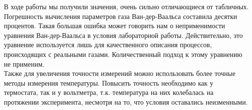 \documentclass[a4paper, 12pt]{article}
\begin{document}
    \noindent В ходе работы мы получили значения, очень сильно отличающиеся от табличных. Погрешность вычисления параметров газа Ван-дер-Ваальса составила десятки процентов. Такая большая ошибка может говорить нам о неприменимости уравнения Ван-дер-Ваальса в условия лабораторной работы. Действительно, это уравнение используется лишь для качественного описания процессов, происходящих с реальными газами. Количественный подход к этому уравнению не применим.\\

    \noindent Также для увеличения точности измерений можно использовать более точные методы измерения температуры. Повысить точность необходимо как у термостата, так и у вольтметра, т.к. температура на них колебалась на протяжении эксперимента, несмотря на то, что условия оставались неизменными.
    
\end{document}
